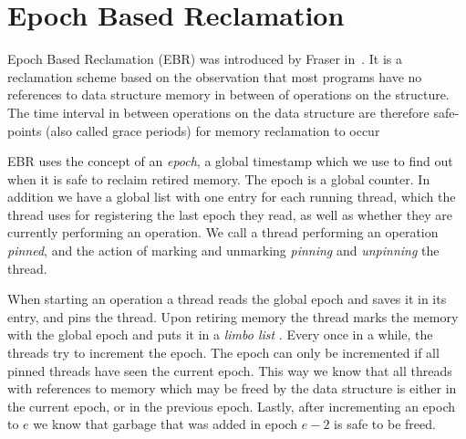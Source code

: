 \documentclass[b5paper]{report}
\begin{document}


%

\section{Epoch Based Reclamation}
Epoch Based Reclamation (EBR) was introduced by Fraser
in~\cite{fraser2004practical}. It is a reclamation scheme based on the
observation that most programs have no references to data structure memory in
between of operations on the structure. The time interval in between
operations on the data structure are therefore safe-points (also called grace
periods) for memory reclamation to occur 

EBR uses the concept of an \emph{epoch}, a global timestamp which we use to
find out when it is safe to reclaim retired memory. The epoch is a global
counter. In addition we have a global list with one entry for each running
thread, which the thread uses for registering the last epoch they read, as well
as whether they are currently performing an operation. We call a thread
performing an operation \emph{pinned}, and the action of marking and unmarking
\emph{pinning} and \emph{unpinning} the thread.

When starting an operation a thread reads the global epoch and saves it in its
entry, and pins the thread. Upon retiring memory the thread marks the memory
with the global epoch and puts it in a \emph{limbo list} . Every once in a while, the threads try to
increment the epoch. The epoch can only be incremented if all pinned threads
have seen the current epoch. This way we know that all threads with references
to memory which may be freed by the data structure is either in the current
epoch, or in the previous epoch. Lastly, after incrementing an epoch to $e$ we
know that garbage that was added in epoch $e-2$ is safe to be freed.
\end{document}
